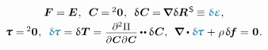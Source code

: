 \nopagebreak\begin{equation}
\begin{array}{c}
\bm{F} = \bm{E} \hspace{.1ex} ,
\:\;
\bm{C} \hspace{-0.1ex} = {\hspace{-0.2ex}^2\bm{0}}
\hspace{.1ex} ,
\:\;
\variation{\hspace{.12ex}\bm{C}} \hspace{-0.1ex} = \hspace{-0.2ex} \boldnabla \hspace{.12ex} \variation{\bm{R}}^{\hspace{.2ex}\mathsf{S}} \hspace{-0.15ex}
\equiv \varbivalent{\mathboldepsilon} ,
\\[.2em]
%
\cauchystress = {\hspace{-0.2ex}^2\bm{0}}
\hspace{.1ex} ,
\:\;
\varbivalent{\hspace{-0.2ex}\cauchystress}
= \variation{\hspace{.1ex}\firstpiolakirchhoffstress}
= \scalebox{0.9}[0.9]{$ \displaystyle \frac{\raisemath{-0.125em}{\partial^2 \hspace{.1ex} \Pi}}{\raisemath{-0.1em}{\partial \hspace{.1ex} \bm{C} \hspace{.1ex} \partial \hspace{.1ex} \bm{C}}} $} \hspace{-0.1ex}
\dotdotp \variation{\hspace{.12ex}\bm{C}} ,
\:\:
\boldnabla \dotp \varbivalent{\hspace{-0.2ex}\cauchystress} \hspace{.1ex}
+ \hspace{.1ex} \rho \hspace{.25ex} \variation{\hspace{-0.2ex}\bm{f}}
= \hspace{.1ex} \bm{0}
\hspace{.1ex} .
\end{array}
\end{equation}

